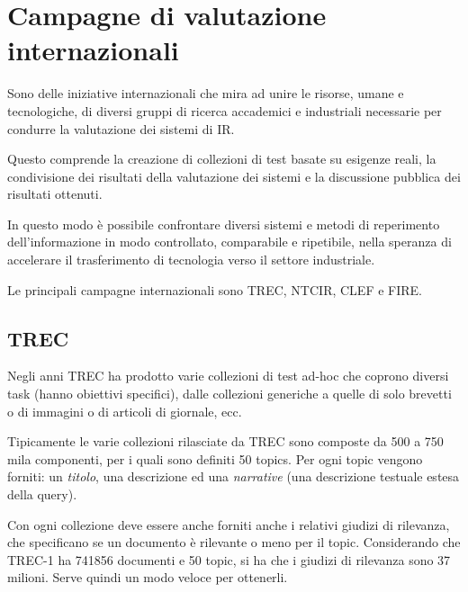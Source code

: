 

\section{Campagne di valutazione internazionali}

Sono delle iniziative internazionali che mira ad unire le risorse, umane e tecnologiche, di diversi gruppi di ricerca accademici e industriali necessarie per condurre la valutazione dei sistemi di IR.

Questo comprende la creazione di collezioni di test basate su esigenze reali, la condivisione dei risultati della valutazione dei sistemi e la discussione pubblica dei risultati ottenuti.

In questo modo è possibile confrontare diversi sistemi e metodi di reperimento dell'informazione in modo controllato, comparabile e ripetibile, nella speranza di accelerare il trasferimento di tecnologia verso il settore industriale.

Le principali campagne internazionali sono TREC, NTCIR, CLEF e FIRE.

\subsection{TREC}

Negli anni TREC ha prodotto varie collezioni di test ad-hoc che coprono diversi task (hanno obiettivi specifici), dalle collezioni generiche a quelle di solo brevetti o di immagini o di articoli di giornale, ecc.

Tipicamente le varie collezioni rilasciate da TREC sono composte da 500 a 750 mila componenti, per i quali sono definiti 50 topics. Per ogni topic vengono forniti: un \textit{titolo}, una descrizione ed una \textit{narrative} (una descrizione testuale estesa della query).

Con ogni collezione deve essere anche forniti anche i relativi giudizi di rilevanza, che specificano se un documento è rilevante o meno per il topic.
Considerando che TREC-1 ha 741856 documenti e 50 topic, si ha che i giudizi di rilevanza sono 37 milioni. Serve quindi un modo veloce per ottenerli.

